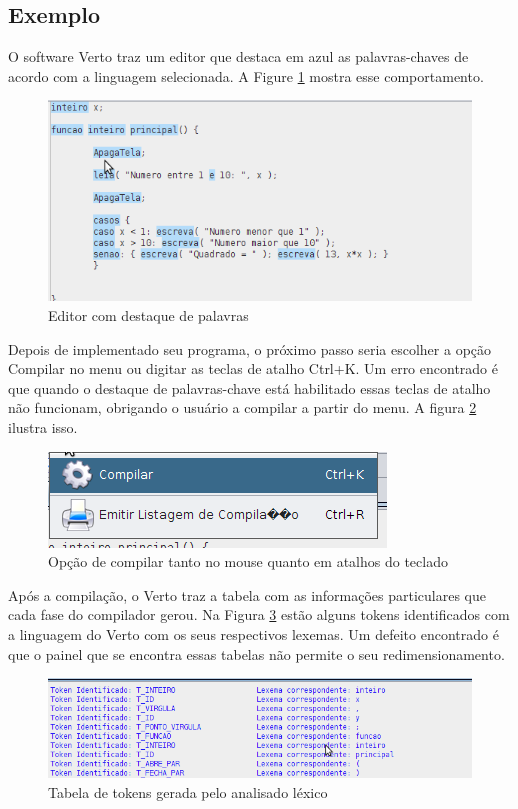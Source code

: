 \subsection{Exemplo} %
\label{sub:exemplo-verto}

O software Verto traz um editor que destaca em azul as palavras-chaves de acordo com a linguagem selecionada.
A Figure \ref{editor-azul} mostra esse comportamento.
\begin{figure}[ht!]
	\centering
	\includegraphics[scale=0.7]{imgs/editor-azul.png}
	\caption{Editor com destaque de palavras}
	\label{editor-azul}
\end{figure}


Depois de implementado seu programa, o próximo passo seria escolher a opção Compilar no menu ou
digitar as teclas de atalho Ctrl+K.
Um erro encontrado é que quando o destaque de palavras-chave está habilitado essas teclas de atalho não funcionam,
obrigando o usuário a compilar a partir do menu.
A figura \ref{opcao-compilar} ilustra isso.
\begin{figure}[ht!]
	\centering
	\includegraphics[scale=0.7]{imgs/compilar-opcao.png}
	\caption{Opção de compilar tanto no mouse quanto em atalhos do teclado}
	\label{opcao-compilar}
\end{figure}


Após a compilação, o Verto traz a tabela com as informações particulares que cada fase do compilador gerou.
Na Figura \ref{tabela-tokens} estão alguns tokens identificados com a linguagem do Verto com os seus respectivos lexemas.
Um defeito encontrado é que o painel que se encontra essas tabelas não permite o seu redimensionamento.
\begin{figure}[ht!]
	\centering
	\includegraphics[scale=0.7]{imgs/tabela-tokens.png}
	\caption{Tabela de tokens gerada pelo analisado léxico}
	\label{tabela-tokens}
\end{figure}


